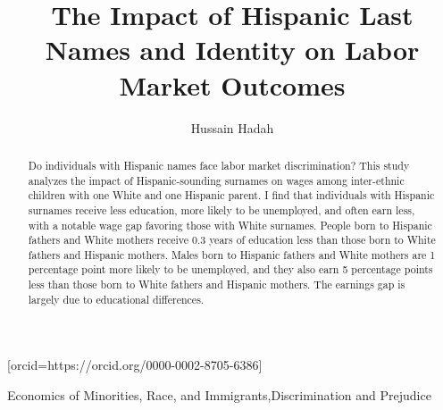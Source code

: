 \documentclass[a4paper,fleqn]{cas-sc}
\begin{document}
\let\WriteBookmarks\relax
\def\floatpagepagefraction{1}
\def\textpagefraction{.001}



\title [mode = title]{The Impact of Hispanic Last Names and Identity on Labor Market Outcomes}

\author[]{Hussain Hadah}[orcid=https://orcid.org/0000-0002-8705-6386]





\begin{abstract}
\singlespacing %
Do individuals with Hispanic names face labor market discrimination? This study analyzes the impact of Hispanic-sounding surnames on wages among inter-ethnic children with one White and one Hispanic parent. I find that individuals with Hispanic surnames receive less education, more likely to be unemployed, and often earn less, with a notable wage gap favoring those with White surnames. People born to Hispanic fathers and White mothers receive 0.3 years of education less than those born to White fathers and Hispanic mothers. Males born to Hispanic fathers and White mothers are 1 percentage point more likely to be unemployed, and they also earn 5 percentage points less than those born to White fathers and Hispanic mothers. The earnings gap is largely due to educational differences.
\end{abstract}

\begin{keywords}
\singlespacing %

 Economics of Minorities, Race, and Immigrants\sep Discrimination and Prejudice\\
\end{keywords}


\maketitle
\end{document}
